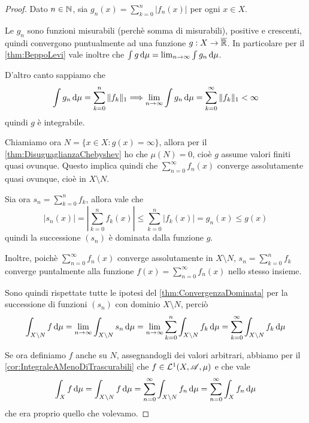 \begin{proof}
	Dato $n\in \mathbb N$, sia $g_n(x)=\sum_{k=0}^n|f_n(x)|$ per ogni $x\in X$. 
	
	Le $g_n$ sono funzioni misurabili (perchè somma di misurabili), positive e crescenti, quindi convergono puntualmente ad una funzione $g:X\to\overline{\mathbb R}$. In particolare per il \cref{thm:BeppoLevi} vale inoltre che $\int g\,\mathrm d\mu=\lim_{n\to\infty}\int g_n\,\mathrm d\mu$.
	
	D'altro canto sappiamo che 
	\begin{equation*}
		\int g_n\,\mathrm d\mu=\sum_{k=0}^n\Vert  f_k\Vert_1 \Longrightarrow \lim_{n\to\infty}\int g_n\,\mathrm d\mu=\sum_{k=0}^\infty \Vert  f_k\Vert_1<\infty
	\end{equation*}
	quindi $g$ è integrabile.
	
	Chiamiamo ora $N=\{ x\in X:g(x)=\infty\}$, allora per il \cref{thm:DisuguaglianzaChebyshev} ho che $\mu(N)=0$, cioè $g$ assume valori finiti quasi ovunque. Questo implica quindi che $\sum_{n=0}^\infty f_n(x)$ converge assolutamente quasi ovunque, cioè in $X\setminus N$.
	
	Sia ora $s_n=\sum_{k=0}^n f_k$, allora vale che
	\begin{equation*}
		|s_n(x)|=\left|\sum_{k=0}^n f_k(x)\right|\le \sum_{k=0}^n |f_k(x)|=g_n(x)\le g(x)
	\end{equation*}
	quindi la successione $(s_n)$ è dominata dalla funzione $g$.
	
	Inoltre, poichè $\sum_{n=0}^\infty f_n(x)$ converge assolutamente in $X\setminus N$, $s_n=\sum_{k=0}^n f_k$ converge puntalmente alla funzione $f(x)=\sum_{n=0}^\infty f_n(x)$ nello stesso insieme.
	
	Sono quindi rispettate tutte le ipotesi del \cref{thm:ConvergenzaDominata} per la successione di funzioni $(s_n)$ con dominio $X\setminus N$, perciò
	\begin{equation*}
		\int_{X\setminus N} f\,\mathrm d\mu=\lim_{n\to\infty}\int_{X\setminus N}s_n\,\mathrm d\mu=\lim_{n\to\infty}\sum_{k=0}^n\int_{X\setminus N}  f_k\,\mathrm d\mu= \sum_{k=0}^\infty\int_{X\setminus N}f_k\,\mathrm d\mu
	\end{equation*}

	Se ora definiamo $f$ anche su $N$, assegnandogli dei valori arbitrari, abbiamo per il \cref{cor:IntegraleAMenoDiTrascurabili} che $f\in \mathcal L^1(X,\mathscr A,\mu)$ e che vale
	\begin{equation*}
		\int_X f\,\mathrm d\mu=\int_{X\setminus N} f\,\mathrm d\mu=\sum_{n=0}^\infty\int_{X\setminus N}f_n\,\mathrm d\mu=\sum_{n=0}^\infty\int_X f_n\,\mathrm d\mu
	\end{equation*}
	che era proprio quello che volevamo.
\end{proof}

